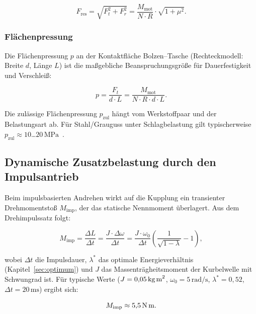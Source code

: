 ﻿\documentclass[a4paper,12pt]{article}
\begin{document}
\begin{equation}
  F_\text{res} = \sqrt{F_t^2 + F_r^2}
    = \frac{M_\text{mot}}{N \cdot R} \cdot \sqrt{1 + \mu^2}.
  \label{eq:Fres}
\end{equation}

\subsubsection*{Flächenpressung}

Die Flächenpressung $p$ an der Kontaktfläche Bolzen--Tasche (Rechteckmodell:
Breite $d$, Länge $L$) ist die maßgebliche Beanspruchungsgröße für
Dauerfestigkeit und Verschleiß:

\begin{equation}
  p = \frac{F_t}{d \cdot L}
    = \frac{M_\text{mot}}{N \cdot R \cdot d \cdot L}.
  \label{eq:pressung}
\end{equation}

Die zulässige Flächenpressung $p_\text{zul}$ hängt vom Werkstoffpaar und
der Belastungsart ab. Für Stahl/Grauguss unter Schlagbelastung gilt
typischerweise $p_\text{zul} \approx 10$\ldots$20\,\text{MPa}$~\cite{shigley2011}.

\subsection{Dynamische Zusatzbelastung durch den Impulsantrieb}

Beim impulsbasierten Andrehen wirkt auf die Kupplung ein transienter
Drehmomentstoß $M_\text{imp}$, der das statische Nennmoment überlagert.
Aus dem Drehimpulssatz folgt:

\begin{equation}
  M_\text{imp} = \frac{\Delta L}{\Delta t}
    = \frac{J \cdot \Delta\omega}{\Delta t}
    = \frac{J \cdot \omega_0}{\Delta t}
      \left(\frac{1}{\sqrt{1-\lambda}} - 1\right),
  \label{eq:Mimp}
\end{equation}

\noindent
wobei $\Delta t$ die Impulsdauer, $\lambda^*$ das optimale Energieverhältnis
(Kapitel~\ref{sec:optimum}) und $J$ das Massenträgheitsmoment der
Kurbelwelle mit Schwungrad ist. Für typische Werte
($J = 0{,}05\,\text{kg\,m}^2$, $\omega_0 = 5\,\text{rad/s}$,
$\lambda^* = 0{,}52$, $\Delta t = 20\,\text{ms}$) ergibt sich:

\begin{equation}
  M_\text{imp} \approx 5{,}5\,\text{N\,m}.
  \label{eq:Mimp_num}
\end{equation}
\end{document}

